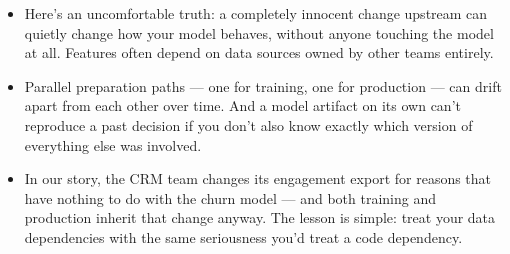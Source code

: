 \documentclass[11pt,a4paper]{article}
\begin{document}
\begin{examplebox}[title after break={SPOKEN SCRIPT --- slide 26 continued}]
\begin{itemize}
\item Here's an uncomfortable truth: a completely innocent change upstream can quietly change how your model behaves, without anyone touching the model at all. Features often depend on data sources owned by other teams entirely.
\item Parallel preparation paths — one for training, one for production — can drift apart from each other over time. And a model artifact on its own can't reproduce a past decision if you don't also know exactly which version of everything else was involved.
\item In our story, the CRM team changes its engagement export for reasons that have nothing to do with the churn model — and both training and production inherit that change anyway. The lesson is simple: treat your data dependencies with the same seriousness you'd treat a code dependency.
\end{itemize}
\end{examplebox}
\par\noindent{\scriptsize\textcolor{teal!60!black}{Reading anchor: Kalinowski, Ch. 14 · Nazir et al. (2024)}}
\clearpage
\end{document}
